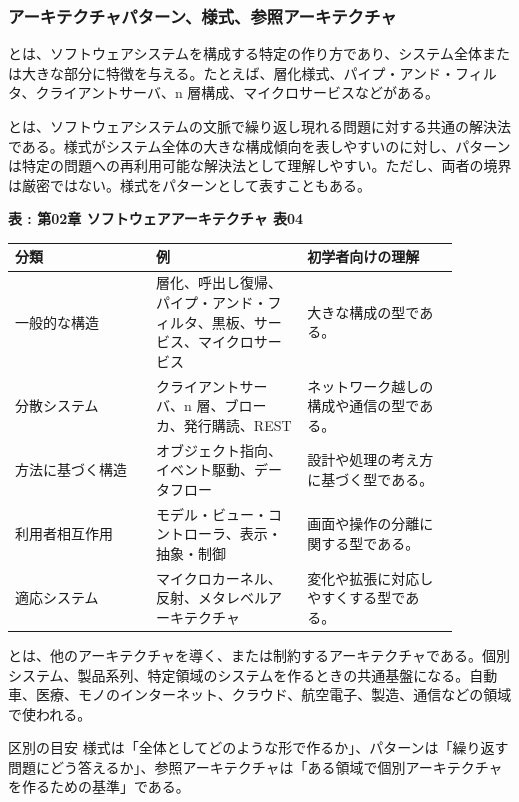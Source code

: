 \subsubsection{アーキテクチャパターン、様式、参照アーキテクチャ}
とは、ソフトウェアシステムを構成する特定の作り方であり、システム全体または大きな部分に特徴を与える。たとえば、層化様式、パイプ・アンド・フィルタ、クライアントサーバ、n 層構成、マイクロサービスなどがある。

とは、ソフトウェアシステムの文脈で繰り返し現れる問題に対する共通の解決法である。様式がシステム全体の大きな構成傾向を表しやすいのに対し、パターンは特定の問題への再利用可能な解決法として理解しやすい。ただし、両者の境界は厳密ではない。様式をパターンとして表すこともある。

\par\smallskip\noindent{}\label{tab:ch02-04}\textbf{表 \thetable: 第02章 ソフトウェアアーキテクチャ 表04}\par\smallskip
\begin{longtable}{P{0.28\linewidth}P{0.30\linewidth}P{0.30\linewidth}}
\toprule
分類 & 例 & 初学者向けの理解 \\
\midrule
一般的な構造 & 層化、呼出し復帰、パイプ・アンド・フィルタ、黒板、サービス、マイクロサービス & 大きな構成の型である。 \\
分散システム & クライアントサーバ、n 層、ブローカ、発行購読、REST & ネットワーク越しの構成や通信の型である。 \\
方法に基づく構造 & オブジェクト指向、イベント駆動、データフロー & 設計や処理の考え方に基づく型である。 \\
利用者相互作用 & モデル・ビュー・コントローラ、表示・抽象・制御 & 画面や操作の分離に関する型である。 \\
適応システム & マイクロカーネル、反射、メタレベルアーキテクチャ & 変化や拡張に対応しやすくする型である。 \\
\bottomrule
\end{longtable}

とは、他のアーキテクチャを導く、または制約するアーキテクチャである。個別システム、製品系列、特定領域のシステムを作るときの共通基盤になる。自動車、医療、モノのインターネット、クラウド、航空電子、製造、通信などの領域で使われる。

\begin{statementbox}{区別の目安}
様式は「全体としてどのような形で作るか」、パターンは「繰り返す問題にどう答えるか」、参照アーキテクチャは「ある領域で個別アーキテクチャを作るための基準」である。
\end{statementbox}

